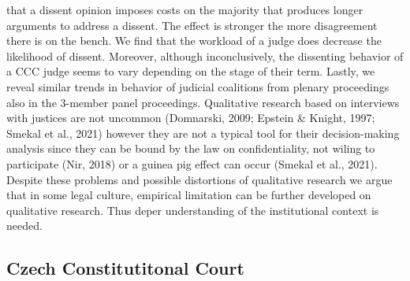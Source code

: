 \documentclass[
  11pt,
]{article}
\begin{document}
that a dissent opinion imposes costs on the majority that produces
longer arguments to address a dissent. The effect is stronger the more
disagreement there is on the bench. We find that the workload of a judge
does decrease the likelihood of dissent. Moreover, although
inconclusively, the dissenting behavior of a CCC judge seems to vary
depending on the stage of their term. Lastly, we reveal similar trends
in behavior of judicial coalitions from plenary proceedings also in the
3-member panel proceedings. Qualitative research based on interviews
with justices are not uncommon (Domnarski, 2009; Epstein \& Knight,
1997; Smekal et al., 2021) however they are not a typical tool for their
decision-making analysis since they can be bound by the law on
confidentiality, not wiling to participate (Nir, 2018) or a guinea pig
effect can occur (Smekal et al., 2021). Despite these problems and
possible distortions of qualitative research we argue that in some legal
culture, empirical limitation can be further developed on qualitative
research. Thus deper understanding of the institutional context is
needed.

\hypertarget{czech-constitutitonal-court}{%
\subsection{Czech Constitutitonal
Court}\label{czech-constitutitonal-court}}
\end{document}
